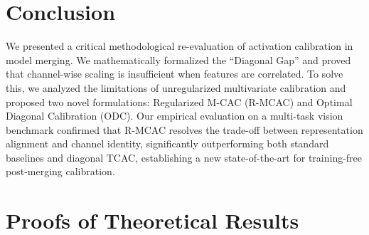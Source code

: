 \documentclass{article}
\theoremstyle{plain}
\theoremstyle{definition}
\theoremstyle{remark}
\begin{document}
\section{Conclusion}
\label{sec:conclusion}
We presented a critical methodological re-evaluation of activation calibration in model merging. We mathematically formalized the ``Diagonal Gap'' and proved that channel-wise scaling is insufficient when features are correlated. To solve this, we analyzed the limitations of unregularized multivariate calibration and proposed two novel formulations: Regularized M-CAC (R-MCAC) and Optimal Diagonal Calibration (ODC). Our empirical evaluation on a multi-task vision benchmark confirmed that R-MCAC resolves the trade-off between representation alignment and channel identity, significantly outperforming both standard baselines and diagonal TCAC, establishing a new state-of-the-art for training-free post-merging calibration.




\newpage
\onecolumn
\appendix
\section{Proofs of Theoretical Results}
\label{sec:proofs}
\end{document}
